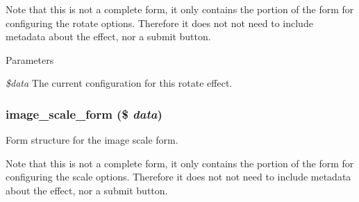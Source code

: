 Note that this is not a complete form, it only contains the portion of the form for configuring the rotate options. Therefore it does not not need to include metadata about the effect, nor a submit button.


\begin{DoxyParams}{Parameters}
\item[{\em \$data}]The current configuration for this rotate effect. \end{DoxyParams}
\hypertarget{image_8admin_8inc_a0cef54d6978f87588088549e59c18363}{
\subsubsection[{image\_\-scale\_\-form}]{\setlength{\rightskip}{0pt plus 5cm}image\_\-scale\_\-form (\$ {\em data})}}
\label{image_8admin_8inc_a0cef54d6978f87588088549e59c18363}
Form structure for the image scale form.

Note that this is not a complete form, it only contains the portion of the form for configuring the scale options. Therefore it does not not need to include metadata about the effect, nor a submit button.


